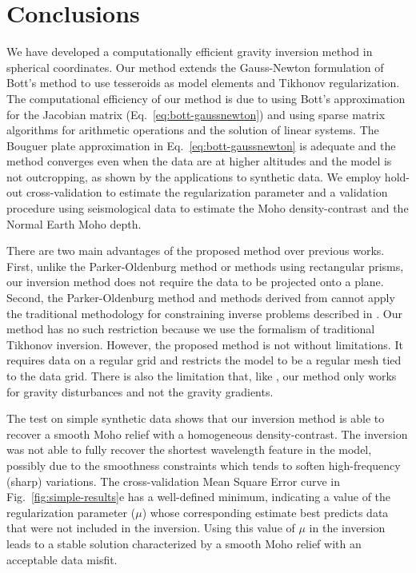 \documentclass[extra,mreferee]{gji}
\begin{document}
\section{Conclusions}

We have developed a computationally efficient gravity inversion method in
spherical coordinates.
Our method extends the Gauss-Newton formulation of Bott's method
\citep{silva2014} to use tesseroids as model elements and Tikhonov
regularization.
The computational efficiency of our method is due to
using Bott's approximation for the Jacobian matrix
(Eq.~\ref{eq:bott-gaussnewton})
and using sparse matrix algorithms for arithmetic operations and the solution
of linear systems.
The Bouguer plate approximation in Eq.~\ref{eq:bott-gaussnewton} is adequate
and the method converges
even when the data are at higher altitudes and the model is not outcropping,
as shown by the applications to synthetic data.
We employ hold-out cross-validation to estimate the regularization parameter
and a validation procedure using seismological data to estimate the Moho
density-contrast and the Normal Earth Moho depth.

There are two main advantages of the proposed method over previous works.
First, unlike the Parker-Oldenburg method \citep{oldenburg1974} or methods
using rectangular prisms, our inversion method does not require the data to be
projected onto a plane.
Second, the Parker-Oldenburg method and methods derived from \citet{bott1960}
\citep[e.g., ][]{silva2014,santos2015} cannot apply the
traditional methodology for constraining inverse problems
described in \citet{silva2001b}.
Our method has no such restriction because we use the formalism of traditional
Tikhonov inversion.
However, the proposed method is not without limitations.
It requires data on a regular grid and restricts the
model to be a regular mesh tied to the data grid.
There is also the limitation that, like \citet{bott1960},
our method only works for gravity disturbances and not the gravity gradients.

The test on simple synthetic data shows that our inversion method is able to
recover a smooth Moho relief with a homogeneous density-contrast.
The inversion was not able to fully recover the shortest wavelength feature in
the model, possibly due to the smoothness constraints which tends to soften
high-frequency (sharp) variations.
The cross-validation Mean Square Error curve in Fig.~\ref{fig:simple-results}e
has a well-defined minimum, indicating a value of the regularization parameter
($\mu$) whose corresponding estimate best predicts data that were not included
in the inversion.
Using this value of $\mu$ in the inversion leads to a stable solution
characterized by a smooth Moho relief with an acceptable data misfit.
\end{document}
